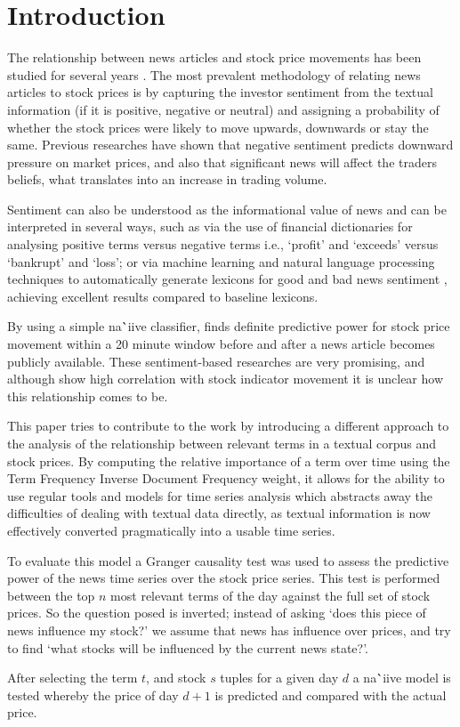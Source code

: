\documentclass{article}
\begin{document}
\section{Introduction}
The relationship between news articles and stock price movements has been studied for several years \citep{gidofalvi2001,Fu2008}. The most prevalent methodology of relating news articles to stock prices is by capturing the investor sentiment \citep{Handbook} from the textual information (if it is positive, negative or neutral) and assigning a probability of whether the stock prices were likely to move upwards, downwards or stay the same. Previous researches \citep{Tetlock2007} have shown that negative sentiment predicts downward pressure on market prices, and also \citep{barber2008all} that significant news will affect the traders beliefs, what translates into an increase in trading volume.
\par
Sentiment can also be understood as the informational value of news and can be interpreted in several ways, such as via the use of financial dictionaries for analysing positive terms versus negative terms 
i.e., `profit' and `exceeds' versus `bankrupt' and `loss'; or via machine learning and natural language processing techniques to automatically generate lexicons for good and bad news sentiment \citep{Oliveira2014}, achieving excellent results compared to baseline lexicons.
\par
By using a simple na\``{i}ive classifier, \citep{gidofalvi2001} finds definite predictive power for stock price movement within a 20 minute window before and after a news article becomes publicly available. These sentiment-based researches are very promising, and although show high correlation with stock indicator movement it is unclear how this relationship comes to be.
\par
This paper tries to contribute to the work by introducing a different approach to the analysis of the relationship between relevant terms in a textual corpus and stock prices. By computing the relative importance of a term over time using the Term Frequency Inverse Document Frequency \citep{Ramos1999} weight, it allows for the ability to use regular tools and models for time series analysis which abstracts away the difficulties of dealing with textual data directly, as textual information is now effectively converted pragmatically into a usable time series.
\par
To evaluate this model a Granger causality test \citep{Granger1969,Granger1980} was used to assess the predictive power of the news time series over the stock price series. This test is performed between the top \(n\) most relevant terms of the day against the full set of stock prices. So the question posed is inverted; instead of asking `does this piece of news influence my stock?' we assume that news has influence over prices, and try to find `what stocks will be influenced by the current news state?'.
\par
After selecting the term \(t\), and stock \(s\) tuples for a given day \(d\) a na\``{i}ive model is tested whereby the price of day \(d+1\) is predicted and compared with the actual price.
\end{document}
